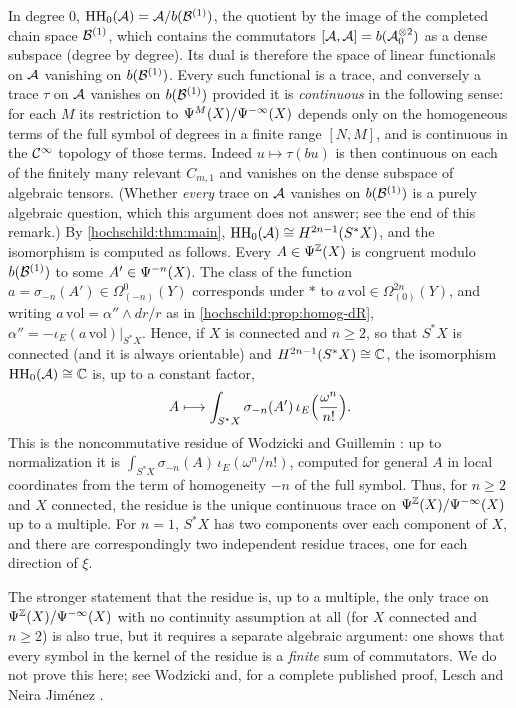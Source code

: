 \begin{remark}\label{hochschild:rem:residue}
In degree $0$, $\operatorname{HH}_0(\mathcal{A})=\mathcal{A}/b(\mathcal{B}^{(1)})$, the quotient by the image of
the completed chain space $\mathcal{B}^{(1)}$, which contains the commutators
$[\mathcal{A},\mathcal{A}]=b(\mathcal{A}_0^{\otimes2})$ as a dense subspace (degree by degree). Its
dual is therefore the space of linear functionals on $\mathcal{A}$ vanishing on
$b(\mathcal{B}^{(1)})$. Every such functional is a trace, and conversely a trace
$\tau$ on $\mathcal{A}$ vanishes on $b(\mathcal{B}^{(1)})$ provided it is \emph{continuous}
in the following sense: for each $M$ its restriction to
$\Psi^{M}(X)/\Psi^{-\infty}(X)$ depends only on the homogeneous terms of
the full symbol of degrees in a finite range $[N,M]$, and is continuous in the
$\mathcal{C}^\infty$ topology of those terms. Indeed $u\mapsto\tau(bu)$ is then continuous
on each of the finitely many relevant $C_{m,1}$ and vanishes on the dense
subspace of algebraic tensors. (Whether \emph{every} trace on $\mathcal{A}$ vanishes
on $b(\mathcal{B}^{(1)})$ is a purely algebraic question, which this argument does not
answer; see the end of this remark.) By
\cref{hochschild:thm:main}, $\operatorname{HH}_0(\mathcal{A})\cong H^{2n-1}(S^*X)$, and the
isomorphism is computed as follows. Every $A\in\Psi^{\mathbb{Z}}(X)$ is congruent
modulo $b(\mathcal{B}^{(1)})$ to some $A'\in\Psi^{-n}(X)$. The class of the function
$a=\sigma_{-n}(A')\in\Omega^0_{(-n)}(Y)$ corresponds under $*$ to
$a\,\mathrm{vol}\in\Omega^{2n}_{(0)}(Y)$, and writing
$a\,\mathrm{vol}=\alpha''\wedge dr/r$ as in \cref{hochschild:prop:homog-dR},
$\alpha''=-\iota_E(a\,\mathrm{vol})|_{S^*X}$. Hence, if $X$ is connected and
$n\ge2$, so that $S^*X$ is connected (and it is always orientable) and
$H^{2n-1}(S^*X)\cong\mathbb{C}$, the isomorphism $\operatorname{HH}_0(\mathcal{A})\cong\mathbb{C}$ is, up to a
constant factor,
\begin{equation*}
  A\longmapsto\int_{S^*X}\sigma_{-n}(A')\,\iota_E\Bigl(\frac{\omega^n}{n!}\Bigr).
\end{equation*}
This is the noncommutative residue of Wodzicki and Guillemin
\cite{Wodzicki-residue,Guillemin-residue}: up to normalization it is
$\int_{S^*X}\sigma_{-n}(A)\,\iota_E(\omega^n/n!)$, computed for general $A$
in local coordinates from the term of homogeneity $-n$ of the full symbol.
Thus, for $n\ge2$ and $X$ connected, the residue is the unique continuous
trace on $\Psi^{\mathbb{Z}}(X)/\Psi^{-\infty}(X)$ up to a multiple. For $n=1$,
$S^*X$ has two components over each component of $X$, and there are
correspondingly two independent residue traces, one for each direction of
$\xi$.

The stronger statement that the residue is, up to a multiple, the only trace
on $\Psi^{\mathbb{Z}}(X)/\Psi^{-\infty}(X)$ with no continuity assumption at all
(for $X$ connected and $n\ge2$) is also true, but it requires a separate
algebraic argument: one shows that every symbol in the kernel of the residue
is a \emph{finite} sum of commutators. We do not prove this here; see
Wodzicki \cite{Wodzicki-residue} and, for a complete published proof,
Lesch and Neira Jim\'enez \cite{Lesch-Neira}.
\end{remark}

